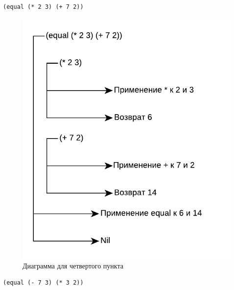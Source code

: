 \begin{lstlisting}
(equal (* 2 3) (+ 7 2))
\end{lstlisting}

\begin{figure}[H]
    \centering
    \includegraphics[scale=0.85]{data/pdf/task_4.pdf}
    \caption{Диаграмма для четвертого пункта}
\end{figure}

\begin{lstlisting}
(equal (- 7 3) (* 3 2))
\end{lstlisting}

